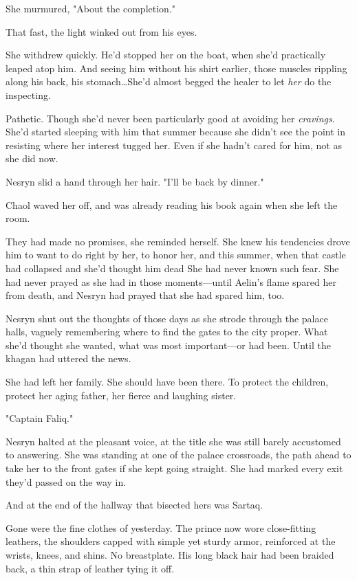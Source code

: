She murmured, "About the completion."

That fast, the light winked out from his eyes.

She withdrew quickly. He'd stopped her on the boat, when she'd practically leaped atop him. And seeing him without his shirt earlier, those muscles rippling along his back, his stomach\ldots She'd almost begged the healer to let \emph{her} do the inspecting.

Pathetic. Though she'd never been particularly good at avoiding her \emph{cravings}. She'd started sleeping with him that summer because she didn't see the point in resisting where her interest tugged her. Even if she hadn't cared for him, not as she did now.

Nesryn slid a hand through her hair. "I'll be back by dinner."

Chaol waved her off, and was already reading his book again when she left the room.

They had made no promises, she reminded herself. She knew his tendencies drove him to want to do right by her, to honor her, and this summer, when that castle had collapsed and she'd thought him dead  She had never known such fear. She had never prayed as she had in those moments---until Aelin's flame spared her from death, and Nesryn had prayed that she had spared him, too.

Nesryn shut out the thoughts of those days as she strode through the palace halls, vaguely remembering where to find the gates to the city proper. What she'd thought she wanted, what was most important---or had been. Until the khagan had uttered the news.

She had left her family. She should have been there. To protect the children, protect her aging father, her fierce and laughing sister.

"Captain Faliq."

Nesryn halted at the pleasant voice, at the title she was still barely accustomed to answering. She was standing at one of the palace crossroads, the path ahead to take her to the front gates if she kept going straight. She had marked every exit they'd passed on the way in.

And at the end of the hallway that bisected hers was Sartaq.

Gone were the fine clothes of yesterday. The prince now wore close-fitting leathers, the shoulders capped with simple yet sturdy armor, reinforced at the wrists, knees, and shins. No breastplate. His long black hair had been braided back, a thin strap of leather tying it off.

